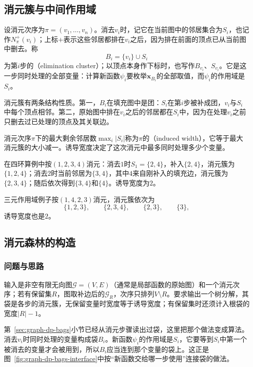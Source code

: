 \subsection{消元簇与中间作用域}
\label{sec:graph-dp-elimination-clusters}

设消元次序为$\pi=(v_1,\ldots,v_n)$。消去$v_i$时，记它在当前图中的邻居集合为$S_i$，也记作$N^+_\pi(v_i)$；上标$+$表示这些邻居都排在$v_i$之后，因为排在前面的顶点已从当前图中删去。称
\[
B_i=\{v_i\}\cup S_i
\]
为第$i$步的（elimination cluster）；以顶点本身作下标时，也写作$B_{v_i}$、$S_{v_i}$。它是这一步同时处理的全部变量：计算新函数$\psi_i$要枚举$\bm x_{B_i}$的全部取值，而$\psi_i$的作用域是$S_i$。

消元簇有两条结构性质。第一，$B_i$在填充图中是团：$S_i$在第$i$步被补成团，$v_i$与$S_i$中每个顶点相邻。第二，原始图中排在$v_i$之后的邻居都在$S_i$中，因为在处理$v_i$之前只删去过已处理的顶点及其关联边。

消元次序$\pi$下的最大剩余邻居数$\max_i|S_i|$称为$\pi$的（induced width），它等于最大消元簇的大小减一。诱导宽度决定了这次消元中最多同时处理多少个变量。

在四环算例中按$(1,2,3,4)$消元：消去$1$时$S_1=\{2,4\}$，补入$\{2,4\}$，消元簇为$\{1,2,4\}$；消去$2$时当前邻居为$\{3,4\}$，其中$4$来自刚补入的填充边，消元簇为$\{2,3,4\}$；随后依次得到$\{3,4\}$和$\{4\}$。诱导宽度为$2$。

三元作用域例子按$(1,4,2,3)$消元，消元簇依次为
\[
 \{1,2,3\},\qquad \{2,3,4\},\qquad \{2,3\},\qquad \{3\},
\]
诱导宽度也是$2$。

\subsection{消元森林的构造}
\label{sec:graph-dp-order-to-decomposition}

\subsubsection{问题与思路}

输入是非空有限无向图$\mathcal G=(V,E)$（通常是局部函数的原始图）和一个消元次序；若有保留集$R$，图取补边后的$\mathcal G_R$，次序只排列$V\setminus R$。要求输出一个树分解，其袋是各步的消元簇，无保留变量时宽度等于诱导宽度；有保留集时还须计入根袋的宽度$|R|-1$。

第~\ref{sec:graph-dp-bags}小节已经从消元步骤读出过袋，这里把那个做法变成算法。消去$v_i$时同时处理的变量构成袋$B_i$。新函数$\psi_i$的作用域是$S_i$，它要等到$S_i$中第一个被消去的变量才会被用到，所以$B_i$应当连到那个变量的袋上。这正是图~\ref{fig:graph-dp-bags-interface}中按“新函数交给哪一步使用”连接袋的做法。

